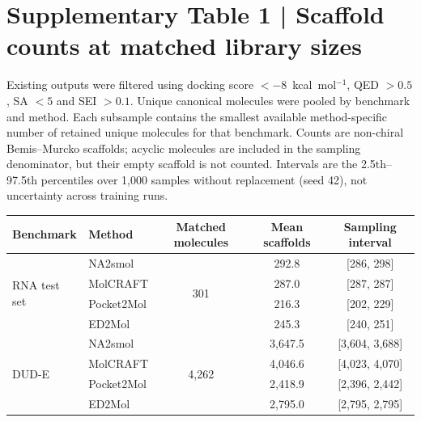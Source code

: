 \section*{Supplementary Table 1 | Scaffold counts at matched library sizes}
Existing outputs were filtered using docking score $<-8$~kcal~mol$^{-1}$, QED $>0.5$, SA $<5$ and SEI $>0.1$. Unique canonical molecules were pooled by benchmark and method. Each subsample contains the smallest available method-specific number of retained unique molecules for that benchmark. Counts are non-chiral Bemis--Murcko scaffolds; acyclic molecules are included in the sampling denominator, but their empty scaffold is not counted. Intervals are the 2.5th--97.5th percentiles over 1,000 samples without replacement (seed 42), not uncertainty across training runs.
\begin{center}\footnotesize
\setlength{\tabcolsep}{4pt}
\begin{tabular}{@{}llccc@{}}
\toprule
\textbf{Benchmark} & \textbf{Method} & \textbf{Matched molecules} & \textbf{Mean scaffolds} & \textbf{Sampling interval} \\
\midrule
\multirow{4}{*}{RNA test set}
  & NA2smol    & \multirow{4}{*}{301} & 292.8 & [286, 298] \\
  & MolCRAFT   &                      & 287.0 & [287, 287] \\
  & Pocket2Mol &                      & 216.3 & [202, 229] \\
  & ED2Mol     &                      & 245.3 & [240, 251] \\
\midrule
\multirow{4}{*}{DUD-E}
  & NA2smol    & \multirow{4}{*}{4,262} & 3,647.5 & [3,604, 3,688] \\
  & MolCRAFT   &                        & 4,046.6 & [4,023, 4,070] \\
  & Pocket2Mol &                        & 2,418.9 & [2,396, 2,442] \\
  & ED2Mol     &                        & 2,795.0 & [2,795, 2,795] \\
\bottomrule
\end{tabular}\end{center}

\clearpage
